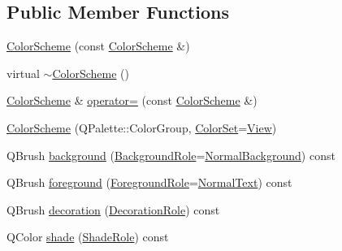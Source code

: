 \subsection*{Public Member Functions}
\begin{DoxyCompactItemize}
\item 
\hyperlink{class_color_scheme_a6ed33197f35e7e735fd18b35823007f6}{Color\+Scheme} (const \hyperlink{class_color_scheme}{Color\+Scheme} \&)
\item 
virtual \hyperlink{class_color_scheme_ad427e52b00c856170e2ae0c8b70582d0}{$\sim$\+Color\+Scheme} ()
\item 
\hyperlink{class_color_scheme}{Color\+Scheme} \& \hyperlink{class_color_scheme_a88462a38d94968c61239a3d5359d5e7d}{operator=} (const \hyperlink{class_color_scheme}{Color\+Scheme} \&)
\item 
\hyperlink{class_color_scheme_a754889d914c61f8fdd29388174367568}{Color\+Scheme} (Q\+Palette\+::\+Color\+Group, \hyperlink{class_color_scheme_a56ea451e86dffa1822ed087902844e05}{Color\+Set}=\hyperlink{class_color_scheme_a56ea451e86dffa1822ed087902844e05a45150fc89ebfd98918cb57ecae48f7c8}{View})
\item 
Q\+Brush \hyperlink{class_color_scheme_a9437750c2aa4c445381a7b814814d557}{background} (\hyperlink{class_color_scheme_a70715e73df1fb0f140797633f8043a8c}{Background\+Role}=\hyperlink{class_color_scheme_a70715e73df1fb0f140797633f8043a8ca9762dd3095372ba69df3c550d96af844}{Normal\+Background}) const
\item 
Q\+Brush \hyperlink{class_color_scheme_aec323dbf2601b8d71ee0b5448e4b8a07}{foreground} (\hyperlink{class_color_scheme_ab0f331e829838e82757088db8ce32ab4}{Foreground\+Role}=\hyperlink{class_color_scheme_ab0f331e829838e82757088db8ce32ab4a8372236563517a7e3ec2d7af791eef12}{Normal\+Text}) const
\item 
Q\+Brush \hyperlink{class_color_scheme_a6dbcccb967faebed786a3e6e453beb3b}{decoration} (\hyperlink{class_color_scheme_a4ad022af301e30791c6c248e1fc656cf}{Decoration\+Role}) const
\item 
Q\+Color \hyperlink{class_color_scheme_aade3447ab7cc9e291474e1e1ea46b4cd}{shade} (\hyperlink{class_color_scheme_a666c52f132343e360756a126d558cdd6}{Shade\+Role}) const
\end{DoxyCompactItemize}
